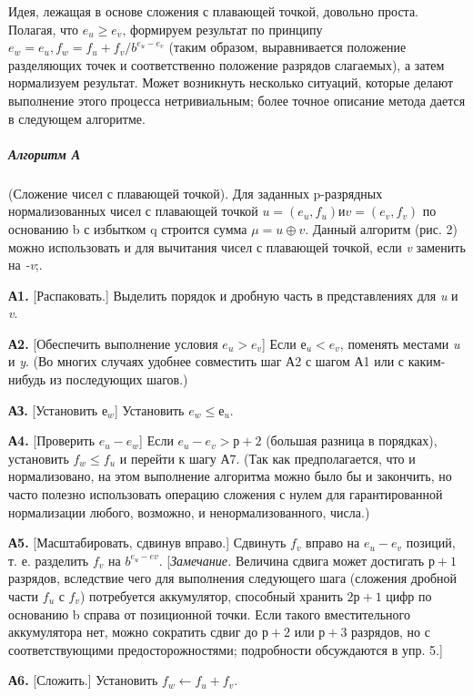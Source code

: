 Идея, лежащая в основе сложения с плавающей точкой, довольно проста. Полагая, что $e_u \geqslant e_v$, формируем результат по принципу $e_w = e_u, f_w = f_u + f_v/b^{e_u-e_v}$ (таким образом, выравнивается положение разделяющих точек и соответственно положение разрядов слагаемых), а затем нормализуем результат. Может возникнуть несколько ситуаций, которые делают выполнение этого процесса нетривиальным; более точное описание метода дается в следующем алгоритме.

\subparagraph{Алгоритм А} (Сложение чисел с плавающей точкой). Для заданных p-разрядных нормализованных чисел с плавающей точкой $u = (e_u,f_u) и v = (e_v,f_v)$ по основанию b с избытком q строится сумма $\mu = u \oplus v$. Данный алгоритм (рис. 2) можно использовать и для вычитания чисел с плавающей точкой, если \textit{v} заменить на \textit{-v};.

\textbf{А1.} [Распаковать.] Выделить порядок и дробную часть в представлениях для \textit{u} и \textit{v}.

\textbf{А2.} [Обеспечить выполнение условия $e_u > e_v$] Если $е_u < e_v$, поменять местами \textit{u} и \textit{y}. (Во многих случаях удобнее совместить шаг А2 с шагом А1 или с каким-нибудь из последующих шагов.)

\textbf{АЗ.} [Установить $е_w$] Установить $e_w \leqslant е_u$.

\textbf{А4.} [Проверить $e_u - e_w$] Если $e_u - e_v > р + 2$ (большая разница в порядках), установить $f_w \leqslant f_u$ и перейти к шагу А7. (Так как предполагается, что и нормализовано, на этом выполнение алгоритма можно было бы и закончить, но часто полезно использовать операцию сложения с нулем для гарантированной нормализации любого, возможно, и ненормализованного, числа.)

\textbf{А5.} [Масштабировать, сдвинув вправо.] Сдвинуть $f_v$ вправо на $e_u - e_v$ позиций, т. е. разделить $f_v$ на $b^{e_u-ev}$. [\textit{Замечание.} Величина сдвига может достигать $р + 1$ разрядов, вследствие чего для выполнения следующего шага (сложения дробной части $f_u$ с $f_v$) потребуется аккумулятор, способный хранить $2р + 1$ цифр по основанию b справа от позиционной точки. Если такого вместительного аккумулятора нет, можно сократить сдвиг до $р + 2$ или $р + 3$ разрядов, но с соответствующими предосторожностями; подробности обсуждаются в упр. 5.]

\textbf{А6.} [Сложить.] Установить $f_w \leftarrow f_u + f_v$.

